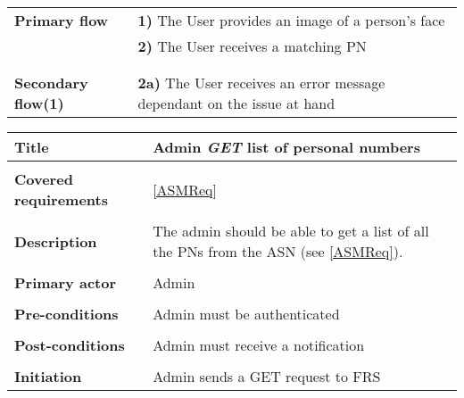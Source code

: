 \documentclass[a4paper,11pt]{article}
\begin{document}
\begin{tabular}{|p{3.5cm}|p{11.5cm}|}
    \textbf{Primary flow} & 
    \textbf{1)} The User provides an image of a person's face \\&
    \textbf{2)} The User receives a matching PN \\&
        
    \\ \hline \rowcolor{Gray} & \\ \hline 
         
    \textbf{Secondary flow(1)} & 
    \textbf{2a)} The User receives an error message dependant on the issue at hand
    \\ \hline 
\end{tabular}


\begin{tabular}{|p{3.5cm}|p{11.5cm}|} \hline
    \textbf{Title} &   Admin \emph{GET} list of personal numbers
        
    \\ \hline \rowcolor{Gray} & \\ \hline
    
                \textbf{Covered requirements} &  \ref{ASMReq}
        
    \\ \hline \rowcolor{Gray} & \\ \hline
        
    \textbf{Description} &  The admin should be able to get a list of all the PNs from the ASN (see \ref{ASMReq}).
        
    \\ \hline \rowcolor{Gray} & \\ \hline
        
    \textbf{Primary actor} & Admin  
        
    \\ \hline \rowcolor{Gray} & \\ \hline 
          
    \textbf{Pre-conditions} &   Admin must be authenticated
        
    \\ \hline \rowcolor{Gray} & \\ \hline
         
    \textbf{Post-conditions} &   Admin must receive a notification
        
    \\ \hline \rowcolor{Gray} & \\ \hline 
         
    \textbf{Initiation} & Admin sends a GET request to FRS
        

\end{tabular}
\end{document}
